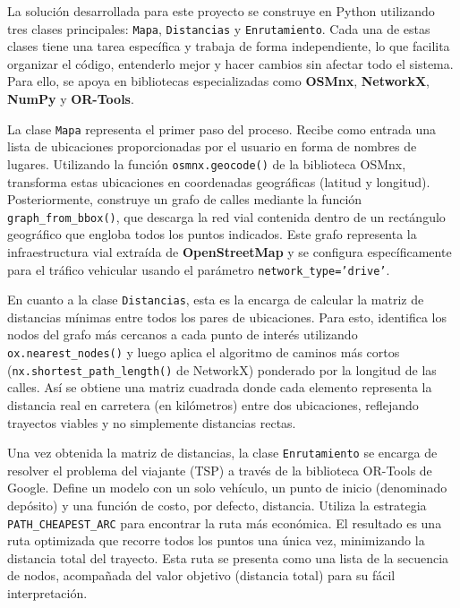 \documentclass[a4paper,12pt]{article}
\begin{document}
La solución desarrollada para este proyecto se construye en Python utilizando tres clases principales: \texttt{Mapa}, \texttt{Distancias} y \texttt{Enrutamiento}. Cada una de estas clases tiene una tarea específica y trabaja de forma independiente, lo que facilita organizar el código, entenderlo mejor y hacer cambios sin afectar todo el sistema. Para ello, se apoya en bibliotecas especializadas como \textbf{OSMnx}, \textbf{NetworkX}, \textbf{NumPy} y \textbf{OR-Tools}.


La clase \texttt{Mapa} representa el primer paso del proceso. Recibe como entrada una lista de ubicaciones proporcionadas por el usuario en forma de nombres de lugares. Utilizando la función \texttt{osmnx.geocode()} de la biblioteca OSMnx, transforma estas ubicaciones en coordenadas geográficas (latitud y longitud). Posteriormente, construye un grafo de calles mediante la función \texttt{graph\_from\_bbox()}, que descarga la red vial contenida dentro de un rectángulo geográfico que engloba todos los puntos indicados. Este grafo representa la infraestructura vial extraída de \textbf{OpenStreetMap} y se configura específicamente para el tráfico vehicular usando el parámetro \texttt{network\_type='drive'}.

En cuanto a la clase \texttt{Distancias}, esta es la encarga de calcular la matriz de distancias mínimas entre todos los pares de ubicaciones. Para esto, identifica los nodos del grafo más cercanos a cada punto de interés utilizando \texttt{ox.nearest\_nodes()} y luego aplica el algoritmo de caminos más cortos (\texttt{nx.shortest\_path\_length()} de NetworkX) ponderado por la longitud de las calles. Así se obtiene una matriz cuadrada donde cada elemento representa la distancia real en carretera (en kilómetros) entre dos ubicaciones, reflejando trayectos viables y no simplemente distancias rectas.

Una vez obtenida la matriz de distancias, la clase \texttt{Enrutamiento} se encarga de resolver el problema del viajante (TSP) a través de la biblioteca OR-Tools de Google. Define un modelo con un solo vehículo, un punto de inicio (denominado depósito) y una función de costo, por defecto, distancia. Utiliza la estrategia \texttt{PATH\_CHEAPEST\_ARC} para encontrar la ruta más económica. El resultado es una ruta optimizada que recorre todos los puntos una única vez, minimizando la distancia total del trayecto. Esta ruta se presenta como una lista de la secuencia de nodos, acompañada del valor objetivo (distancia total) para su fácil interpretación.
\end{document}
